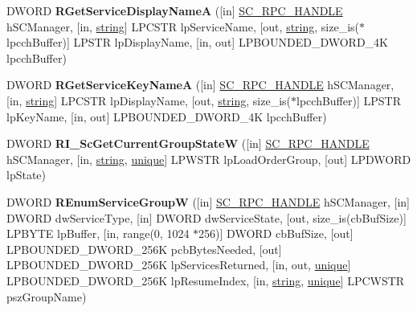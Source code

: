 \begin{DoxyCompactItemize}
\item 
\mbox{\label{interfacesvcctl_abbdae316e6104beb8502425a559e43a5}} 
D\+W\+O\+RD {\bfseries R\+Get\+Service\+Display\+NameA} (\mbox{[}in\mbox{]} \hyperlink{interfacevoid}{S\+C\+\_\+\+R\+P\+C\+\_\+\+H\+A\+N\+D\+LE} h\+S\+C\+Manager, \mbox{[}in, \hyperlink{structstring}{string}\mbox{]} L\+P\+C\+S\+TR lp\+Service\+Name, \mbox{[}out, \hyperlink{structstring}{string}, size\+\_\+is($\ast$lpcch\+Buffer)\mbox{]} L\+P\+S\+TR lp\+Display\+Name, \mbox{[}in, out\mbox{]} L\+P\+B\+O\+U\+N\+D\+E\+D\+\_\+\+D\+W\+O\+R\+D\+\_\+4K lpcch\+Buffer)
\item 
\mbox{\label{interfacesvcctl_a90489039a0828b7a77b3041a36fea842}} 
D\+W\+O\+RD {\bfseries R\+Get\+Service\+Key\+NameA} (\mbox{[}in\mbox{]} \hyperlink{interfacevoid}{S\+C\+\_\+\+R\+P\+C\+\_\+\+H\+A\+N\+D\+LE} h\+S\+C\+Manager, \mbox{[}in, \hyperlink{structstring}{string}\mbox{]} L\+P\+C\+S\+TR lp\+Display\+Name, \mbox{[}out, \hyperlink{structstring}{string}, size\+\_\+is($\ast$lpcch\+Buffer)\mbox{]} L\+P\+S\+TR lp\+Key\+Name, \mbox{[}in, out\mbox{]} L\+P\+B\+O\+U\+N\+D\+E\+D\+\_\+\+D\+W\+O\+R\+D\+\_\+4K lpcch\+Buffer)
\item 
\mbox{\label{interfacesvcctl_acbcece2def17fbe4efdd43bff2915513}} 
D\+W\+O\+RD {\bfseries R\+I\+\_\+\+Sc\+Get\+Current\+Group\+StateW} (\mbox{[}in\mbox{]} \hyperlink{interfacevoid}{S\+C\+\_\+\+R\+P\+C\+\_\+\+H\+A\+N\+D\+LE} h\+S\+C\+Manager, \mbox{[}in, \hyperlink{structstring}{string}, \hyperlink{interfaceunique}{unique}\mbox{]} L\+P\+W\+S\+TR lp\+Load\+Order\+Group, \mbox{[}out\mbox{]} L\+P\+D\+W\+O\+RD lp\+State)
\item 
\mbox{\label{interfacesvcctl_a2a7eb5a8f9d0a154717070c362d319f4}} 
D\+W\+O\+RD {\bfseries R\+Enum\+Service\+GroupW} (\mbox{[}in\mbox{]} \hyperlink{interfacevoid}{S\+C\+\_\+\+R\+P\+C\+\_\+\+H\+A\+N\+D\+LE} h\+S\+C\+Manager, \mbox{[}in\mbox{]} D\+W\+O\+RD dw\+Service\+Type, \mbox{[}in\mbox{]} D\+W\+O\+RD dw\+Service\+State, \mbox{[}out, size\+\_\+is(cb\+Buf\+Size)\mbox{]} L\+P\+B\+Y\+TE lp\+Buffer, \mbox{[}in, range(0, 1024 $\ast$256)\mbox{]} D\+W\+O\+RD cb\+Buf\+Size, \mbox{[}out\mbox{]} L\+P\+B\+O\+U\+N\+D\+E\+D\+\_\+\+D\+W\+O\+R\+D\+\_\+256K pcb\+Bytes\+Needed, \mbox{[}out\mbox{]} L\+P\+B\+O\+U\+N\+D\+E\+D\+\_\+\+D\+W\+O\+R\+D\+\_\+256K lp\+Services\+Returned, \mbox{[}in, out, \hyperlink{interfaceunique}{unique}\mbox{]} L\+P\+B\+O\+U\+N\+D\+E\+D\+\_\+\+D\+W\+O\+R\+D\+\_\+256K lp\+Resume\+Index, \mbox{[}in, \hyperlink{structstring}{string}, \hyperlink{interfaceunique}{unique}\mbox{]} L\+P\+C\+W\+S\+TR psz\+Group\+Name)

\end{DoxyCompactItemize}
